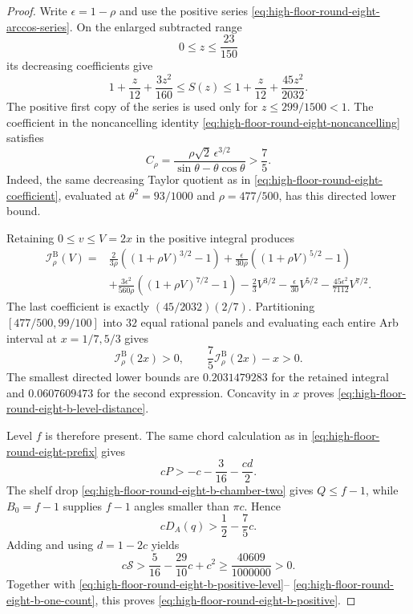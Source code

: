 \documentclass[11pt]{article}
\theoremstyle{remark}
\begin{document}
\begin{proof}
Write $\epsilon=1-\rho$ and use the positive series
\eqref{eq:high-floor-round-eight-arccos-series}.  On the enlarged
subtracted range
\[
 0\leq z\leq\frac{23}{150}
\]
its decreasing coefficients give
\begin{equation}
 1+\frac z{12}+\frac{3z^2}{160}
 \leq S(z)\leq
 1+\frac z{12}+\frac{45z^2}{2032}.
 \label{eq:high-floor-round-eight-b-series}
\end{equation}
The positive first copy of the series is used only for
$z\leq299/1500<1$.  The coefficient in the noncancelling identity
\eqref{eq:high-floor-round-eight-noncancelling} satisfies
\begin{equation}
 C_\rho=\frac{\rho\sqrt2\,\epsilon^{3/2}}
 {\sin\theta-\theta\cos\theta}>\frac75.
 \label{eq:high-floor-round-eight-b-coefficient}
\end{equation}
Indeed, the same decreasing Taylor quotient as in
\eqref{eq:high-floor-round-eight-coefficient}, evaluated at
$\theta^2=93/1000$ and $\rho=477/500$, has this directed lower bound.

Retaining $0\leq v\leq V=2x$ in the positive integral produces
\begin{equation}
\begin{aligned}
 \mathcal I^{\mathrm B}_\rho(V)
={}&\frac{2}{3\rho}
 \left((1+\rho V)^{3/2}-1\right)
 +\frac{\epsilon}{30\rho}
 \left((1+\rho V)^{5/2}-1\right)\\
&+\frac{3\epsilon^2}{560\rho}
 \left((1+\rho V)^{7/2}-1\right)
 -\frac23V^{3/2}-\frac{\epsilon}{30}V^{5/2}
 -\frac{45\epsilon^2}{7112}V^{7/2}.
\end{aligned}
 \label{eq:high-floor-round-eight-b-integral}
\end{equation}
The last coefficient is exactly $(45/2032)(2/7)$.  Partitioning
$[477/500,99/100]$ into $32$ equal rational panels and evaluating each
entire Arb interval at $x=1/7,5/3$ gives
\begin{equation}
 \mathcal I^{\mathrm B}_\rho(2x)>0,\qquad
 \frac75\mathcal I^{\mathrm B}_\rho(2x)-x>0.
 \label{eq:high-floor-round-eight-b-panels}
\end{equation}
The smallest directed lower bounds are $0.2031479283$ for the retained
integral and $0.0607609473$ for the second expression.  Concavity in
$x$ proves \eqref{eq:high-floor-round-eight-b-level-distance}.

Level $f$ is therefore present.  The same chord calculation as in
\eqref{eq:high-floor-round-eight-prefix} gives
\[
 cP>-c-\frac3{16}-\frac{cd}{2}.
\]
The shelf drop \eqref{eq:high-floor-round-eight-b-chamber-two} gives
$Q\leq f-1$, while $B_0=f-1$ supplies $f-1$ angles smaller than
$\pi c$.  Hence
\[
 cD_A(q)>\frac12-\frac75c.
\]
Adding and using $d=1-2c$ yields
\begin{equation}
 c\mathcal S>\frac5{16}-\frac{29}{10}c+c^2
 \geq\frac{40609}{1000000}>0.
 \label{eq:high-floor-round-eight-b-small-delta}
\end{equation}
Together with
\eqref{eq:high-floor-round-eight-b-positive-level}--%
\eqref{eq:high-floor-round-eight-b-one-count}, this proves
\eqref{eq:high-floor-round-eight-b-positive}.


\end{proof}
\end{document}
